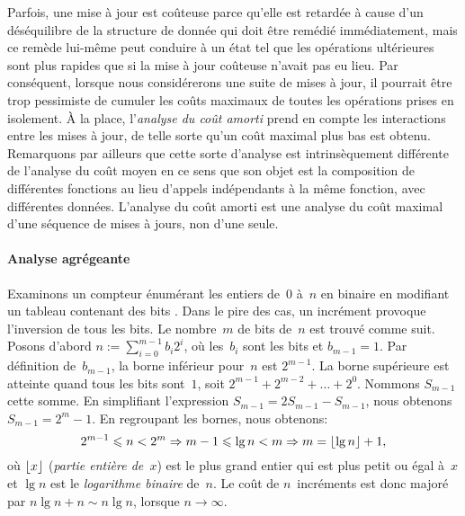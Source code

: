 \label{par:amortised_cost}

Parfois, une mise à jour est coûteuse parce qu'elle est retardée à
cause d'un déséquilibre de la structure de donnée qui doit être
remédié immédiatement, mais ce remède lui-même peut conduire à un état
tel que les opérations ultérieures sont plus rapides que si la mise à
jour coûteuse n'avait pas eu lieu. Par conséquent, lorsque nous
considérerons une suite de mises à jour, il pourrait être trop
pessimiste de cumuler les coûts maximaux de toutes les opérations
prises en isolement. À la place, l'\emph{analyse du coût amorti}
\citep{Okasaki_1998a} \citep[\S{}17]{CLRS_2009} prend en compte les interactions entre les mises à jour, de
telle sorte qu'un coût maximal plus bas est obtenu. Remarquons par
ailleurs que cette sorte d'analyse est intrinsèquement différente de
l'analyse du coût moyen en ce sens que son objet est la composition de
différentes fonctions au lieu d'appels indépendants à la même
fonction, avec différentes données. L'analyse du coût amorti est une
analyse du coût maximal d'une séquence de mises à jours, non d'une
seule.

\paragraph{Analyse agrégeante}
\label{par:aggregate}

Examinons un compteur énumérant les entiers de~\(0\) à~\(n\) en
binaire en modifiant un tableau contenant des bits
\cite[\S{}17.1]{CLRS_2009}. Dans le pire des cas, un incrément
provoque l'inversion de tous les bits. Le nombre~\(m\) de bits
de~\(n\) est trouvé comme suit. Posons d'abord \(n :=
\sum_{i=0}^{m-1}{b_i2^i}\), où les~\(b_i\) sont les bits et
\(b_{m-1}=1\). Par définition de~\(b_{m-1}\), la borne inférieur
pour~\(n\) est \(2^{m-1}\). La borne supérieure est atteinte quand
tous les bits sont~\(1\), soit \(2^{m-1} + 2^{m-2} + \ldots +
2^0\). Nommons \(S_{m-1}\) cette somme. En simplifiant l'expression
\(S_{m-1} = 2 S_{m-1} - S_{m-1}\), nous obtenons \(S_{m-1} = 2^m -
1\). En regroupant les bornes, nous obtenons:
\begin{equation}
2^{m-1} \leqslant n < 2^m \Rightarrow m - 1 \leqslant \lg n
< m \Rightarrow m = \lfloor{\lg n}\rfloor + 1,
\label{eq:num_of_bits}
\end{equation}
où \(\lfloor{x}\rfloor\) (\textsl{partie entière de~\(x\)}) est
le plus grand entier qui est plus petit ou égal à~\(x\) et \(\lg n\)
est le \emph{logarithme binaire} de~\(n\). Le coût de \(n\)~incréments
est donc majoré par \(n\lg n + n \sim n\lg n\), lorsque \(n
\rightarrow \infty\).

